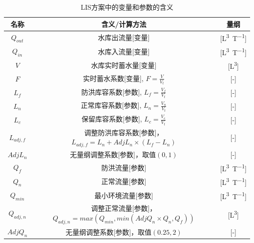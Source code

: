 \begin{table}[htbp]
    \centering
    \caption{LIS方案中的变量和参数的含义}
    \label{tab:LIS方案变量参数表}
    \begin{threeparttable}
    \begin{tabular}{ccc}
    \toprule
    名称 & 含义/计算方法 & 量纲 \\ \midrule
    $Q_{out}$  & 水库出流量[变量]  &
    [\unit{L^3.T^{-1}}]  \\   $Q_{in}$ & 水库入流量[变量] & [\unit{L^3.T^{-1}}] \\
    $V$ & 水库实时蓄水量[变量] & [\unit{L^3}] \\
    $F$  &  实时蓄水系数[变量], $F=\frac{V}{V_{t}}$ & [-] \\
    $L_{f}$ & 防洪库容系数[参数], $L_{f}=\frac{V_{f}}{V_{t}}$ &[-] \\
    $L_{n}$  & 正常库容系数[参数], $L_{n}=\frac{V_{n}}{V_{t}}$ & [-]  \\
    $L_{c}$  & 保留库容系数[参数], $L_{c}=\frac{V_{c}}{V_{t}}$ & [-]  \\
    $L_{adj,f}$ & \makecell{调整防洪库容系数[参数]，\\$L_{adj,f} = L_{n}+AdjL_{n} \times \left(L_{f}-L_{n}\right)$} & [-]  \\
    $AdjL_{n}$ & 无量纲调整系数[参数]，取值$\left(0,1\right)$ & [-]  \\
    $Q_{f}$ & 防洪流量[参数] & [\unit{L^3.T^{-1}}]  \\
    $Q_{n}$ & 正常流量[参数] & [\unit{L^3.T^{-1}}]  \\
    $Q_{min}$ & 最小环境流量[参数] & [\unit{L^3.T^{-1}}] \\
    $Q_{adj,n}$ & \makecell{调整正常流量[参数]，\\$Q_{adj,n}={max(Q_{min},{min(AdjQ_{n} \times Q_{n},Q_{f})})}$} & [\unit{L^3}] \\
    $AdjQ_{n}$ & 无量纲调整系数[参数]，取值$\left(0.25,2\right)$ &
    [-]\\
    \bottomrule
    \end{tabular}
    \end{threeparttable}
\end{table}

